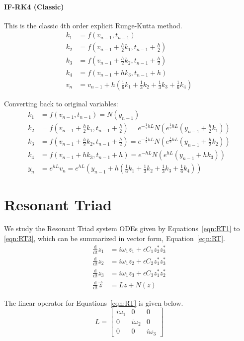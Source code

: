 \documentclass{article}
\newcommand{\ddt}{\frac{\mathrm{d}}{\mathrm{d}t}}
\theoremstyle{definition}
\begin{document}
\paragraph{IF-RK4 (Classic)} This is the classic 4th order explicit Runge-Kutta method.
\begin{align*}
k_1 &= f(v_{n-1}, t_{n-1})\\
k_2 &= f(v_{n-1}+\frac{h}{2}k_1, t_{n-1}+\frac{h}{2})\\
k_3 &= f(v_{n-1} + \frac{h}{2}k_2, t_{n-1}+\frac{h}{2})\\
k_4 &= f(v_{n-1}+hk_3, t_{n-1}+h)\\
v_n &= v_{n-1} + h(\frac{1}{6}k_1+\frac{1}{3}k_2+\frac{1}{3}k_3+\frac{1}{6}k_4)
\end{align*}

Converting back to original variables:
\begin{align*}
k_1 &= f(v_{n-1}, t_{n-1})=N(y_{n-1})\\
k_2 &= f(v_{n-1}+\frac{h}{2}k_1, t_{n-1}+\frac{h}{2}) = e^{-\frac{1}{2}hL}N\left(e^{\frac{1}{2}hL}(y_{n-1}+\frac{h}{2}k_1)\right)\\
k_3 &= f(v_{n-1} + \frac{h}{2}k_2, t_{n-1}+\frac{h}{2})= e^{-\frac{1}{2}hL}N\left(e^{\frac{1}{2}hL}(y_{n-1}+\frac{h}{2}k_2)\right)\\
k_4 &= f(v_{n-1}+hk_3, t_{n-1}+h) = e^{-hL}N\left(e^{hL}(y_{n-1}+hk_3)\right)\\
y_n &= e^{hL}v_n =e^{hL} \left(y_{n-1} + h(\frac{1}{6}k_1+\frac{1}{3}k_2+\frac{1}{3}k_3+\frac{1}{6}k_4)\right)
\end{align*}


\section{Resonant Triad}
We study the Resonant Triad system ODEs given by Equations~\ref{eqn:RT1} to \ref{eqn:RT3}, which can be summarized in vector form, Equation~\ref{eqn:RT}.
\begin{align}
\ddt z_1 &= i\omega_1 z_1 + \epsilon C_1 z_2^*z_3^*\label{eqn:RT1} \\
\ddt z_2 &= i\omega_1 z_2 + \epsilon C_2 z_1^*z_3^*\label{eqn:RT2} \\
\ddt z_3 &= i\omega_1 z_3 + \epsilon C_3 z_1^*z_2^*\label{eqn:RT3} \\
\ddt \vec{z} &= Lz + N(z) \label{eqn:RT}
\end{align}

The linear operator for Equations~\ref{eqn:RT} is given below.
\begin{equation}
L = \begin{bmatrix}
i\omega_1 & 0 & 0\\
0 &i\omega_2 & 0 \\
0 & 0 & i\omega_3 
\end{bmatrix}
\end{equation}
\end{document}
